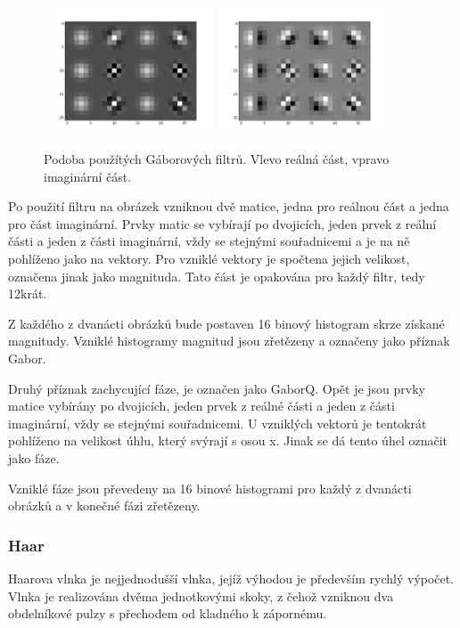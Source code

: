 \documentclass[czech,BP]{thesiskiv}
\begin{document}
\begin{figure}[H]
	\centering
	\includegraphics[width=190px]{./img/gabor_filtry.png}
	\includegraphics[width=190px]{./img/gabor_filter_imag.png}	
	\caption{Podoba použítých Gáborových filtrů. Vlevo reálná část, vpravo imaginární část.}
\end{figure}

\par Po použití filtru na obrázek vzniknou dvě matice, jedna pro reálnou část a jedna pro část imaginární. Prvky matic se vybírají po dvojicích, jeden prvek z reální části a jeden z části imaginární, vždy se stejnými souřadnicemi a je na ně pohlíženo jako na vektory. Pro vzniklé vektory je spočtena jejich velikost, označena jinak jako magnituda. Tato část je opakována pro každý filtr, tedy 12krát.

\par Z každého z dvanácti obrázků bude postaven 16 binový histogram skrze získané magnitudy. Vzniklé histogramy magnitud jsou zřetězeny a označeny jako příznak Gabor. 

\par Druhý příznak zachycující fáze, je označen jako GaborQ. Opět je jsou prvky matice vybírány po dvojicích, jeden prvek z reálné části a jeden z části imaginární, vždy se stejnými souřadnicemi. U vzniklých vektorů je tentokrát pohlíženo na velikost úhlu, který svýrají s osou x. Jinak se dá tento úhel označit jako fáze.   
\par Vzniklé fáze jsou převedeny na 16 binové histogrami pro každý z dvanácti obrázků a v konečné fázi zřetězeny.


\subsubsection{Haar}
\par Haarova vlnka je nejjednodušší vlnka, jejíž výhodou je především rychlý výpočet. Vlnka je realizována dvěma jednotkovými skoky, z čehož vzniknou dva obdelníkové pulzy s přechodem od kladného k zápornému. 
\end{document}
